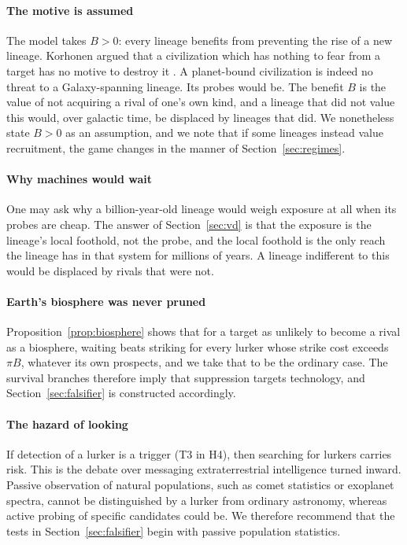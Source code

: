 \documentclass[preprint,12pt]{elsarticle}
\theoremstyle{definition}
\begin{document}
\paragraph{The motive is assumed}
The model takes $B > 0$: every lineage benefits from preventing the rise of a new lineage. Korhonen argued that a civilization which has nothing to fear from a target has no motive to destroy it \citep{Korhonen2013}. A planet-bound civilization is indeed no threat to a Galaxy-spanning lineage. Its probes would be. The benefit $B$ is the value of not acquiring a rival of one's own kind, and a lineage that did not value this would, over galactic time, be displaced by lineages that did. We nonetheless state $B > 0$ as an assumption, and we note that if some lineages instead value recruitment, the game changes in the manner of Section~\ref{sec:regimes}.

\paragraph{Why machines would wait}
One may ask why a billion-year-old lineage would weigh exposure at all when its probes are cheap. The answer of Section~\ref{sec:vd} is that the exposure is the lineage's local foothold, not the probe, and the local foothold is the only reach the lineage has in that system for millions of years. A lineage indifferent to this would be displaced by rivals that were not.

\paragraph{Earth's biosphere was never pruned}
Proposition~\ref{prop:biosphere} shows that for a target as unlikely to become a rival as a biosphere, waiting beats striking for every lurker whose strike cost exceeds $\pi B$, whatever its own prospects, and we take that to be the ordinary case. The survival branches therefore imply that suppression targets technology, and Section~\ref{sec:falsifier} is constructed accordingly.

\paragraph{The hazard of looking}
If detection of a lurker is a trigger (T3 in H4), then searching for lurkers carries risk. This is the debate over messaging extraterrestrial intelligence turned inward. Passive observation of natural populations, such as comet statistics or exoplanet spectra, cannot be distinguished by a lurker from ordinary astronomy, whereas active probing of specific candidates could be. We therefore recommend that the tests in Section~\ref{sec:falsifier} begin with passive population statistics.
\end{document}

